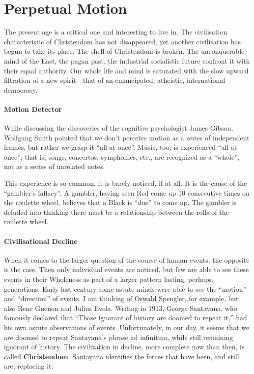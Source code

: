\section{Perpetual Motion}

\begin{quotex}
The present age is a critical one and interesting to live in. The civilisation characteristic of Christendom has not disappeared, yet another civilisation has begun to take its place. The shell of Christendom is broken. The unconquerable mind of the East, the pagan past, the industrial socialistic future confront it with their equal authority. Our whole life and mind is saturated with the slow upward filtration of a new spirit---that of an emancipated, atheistic, international democracy.
\end{quotex}


\paragraph{Motion Detector}


While discussing the discoveries of the cognitive psychologist James Gibson, Wolfgang Smith pointed that we don't perceive motion as a series of independent frames, but rather we grasp it ``all at once''. Music, too, is experienced ``all at once''; that is, songs, concertos, symphonies, etc., are recognized as a ``whole'', not as a series of unrelated notes.

This experience is so common, it is barely noticed, if at all. It is the cause of the ``gambler's fallacy''. A gambler, having seen Red come up 10 consecutive times on the roulette wheel, believes that a Black is ``due'' to come up. The gambler is deluded into thinking there must be a relationship between the rolls of the roulette wheel.

\paragraph{Civilisational Decline}


When it comes to the larger question of the course of human events, the opposite is the case. Then only individual events are noticed, but few are able to see these events in their Wholeness as part of a larger pattern lasting, perhaps, generations. Early last century some astute minds were able to see the ``motion'' and ``direction'' of events. I am thinking of Oswald Spengler, for example, but also Rene Guenon and Julius Evola. Writing in 1913, George Santayana, who famously declared that ``Those ignorant of history are doomed to repeat it,'' had his own astute observations of events. Unfortunately, in our day, it seems that we are doomed to repeat Santayana's phrase ad infinitum, while still remaining ignorant of history. The civilization in decline, more complete now than then, is called \textbf{Christendom}. Santayana identifies the forces that have been, and still are, replacing it:


